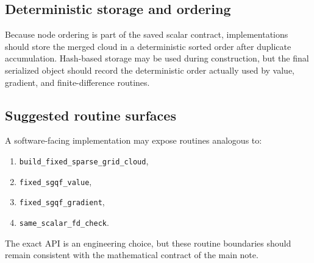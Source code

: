 \documentclass[11pt]{article}
\numberwithin{equation}{section}
\begin{document}
\subsection{Deterministic storage and ordering}

Because node ordering is part of the saved scalar contract, implementations
should store the merged cloud in a deterministic sorted order after duplicate
accumulation.  Hash-based storage may be used during construction, but the final
serialized object should record the deterministic order actually used by value,
gradient, and finite-difference routines.

\subsection{Suggested routine surfaces}

A software-facing implementation may expose routines analogous to:
\begin{enumerate}[leftmargin=0.3in]
  \item \texttt{build\_fixed\_sparse\_grid\_cloud},
  \item \texttt{fixed\_sgqf\_value},
  \item \texttt{fixed\_sgqf\_gradient},
  \item \texttt{same\_scalar\_fd\_check}.
\end{enumerate}
The exact API is an engineering choice, but these routine boundaries should
remain consistent with the mathematical contract of the main note.



\end{document}
